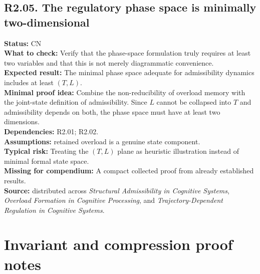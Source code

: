 \documentclass[12pt]{article}
\begin{document}
	\subsection*{R2.05. The regulatory phase space is minimally two-dimensional}
	\textbf{Status:} CN \\
	\textbf{What to check:} Verify that the phase-space formulation truly requires at least two variables and that this is not merely diagrammatic convenience. \\
	\textbf{Expected result:} The minimal phase space adequate for admissibility dynamics includes at least $(T,L)$. \\
	\textbf{Minimal proof idea:} Combine the non-reducibility of overload memory with the joint-state definition of admissibility. Since $L$ cannot be collapsed into $T$ and admissibility depends on both, the phase space must have at least two dimensions. \\
	\textbf{Dependencies:} R2.01; R2.02. \\
	\textbf{Assumptions:} retained overload is a genuine state component. \\
	\textbf{Typical risk:} Treating the $(T,L)$ plane as heuristic illustration instead of minimal formal state space. \\
	\textbf{Missing for compendium:} A compact collected proof from already established results. \\
	\textbf{Source:} distributed across \emph{Structural Admissibility in Cognitive Systems}, \emph{Overload Formation in Cognitive Processing}, and \emph{Trajectory-Dependent Regulation in Cognitive Systems}.
	
	\section{Invariant and compression proof notes}
	
\end{document}
